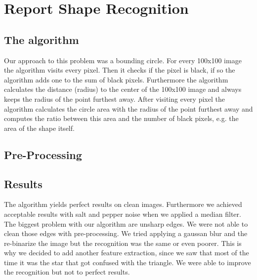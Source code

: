 \documentclass[a4paper, 10pt]{article}
\begin{document}
	\section{Report Shape Recognition}
	
	\subsection{The algorithm}
	
	\par{Our approach to this problem was a bounding circle. For every 100x100 image the algorithm visits every pixel. Then it checks if the pixel is black, if so the algorithm adds one to the sum of black pixels. Furthermore the algorithm calculates the distance (radius) to the center of the 100x100 image and always keeps the radius of the point furthest away. After visiting every pixel the algorithm calculates the circle area with the radius of the point furthest away and computes the ratio between this area and the number of black pixels, e.g. the area of the shape itself. }
	
	\subsection{Pre-Processing}
	
	\par{}
	
	\subsection{Results}
	
	\par{The algorithm yields perfect results on clean images. Furthermore we achieved acceptable results with salt and pepper noise when we applied a median filter. The biggest problem with our algorithm are unsharp edges. We were not able to clean those edges with pre-processing. We tried applying a gaussan blur and the re-binarize the image but the recognition was the same or even poorer. This is why we decided to add another feature extraction, since we saw that most of the time it was the star that got confused with the triangle. We were able to improve the recognition but not to perfect results.}
	
\end{document}
